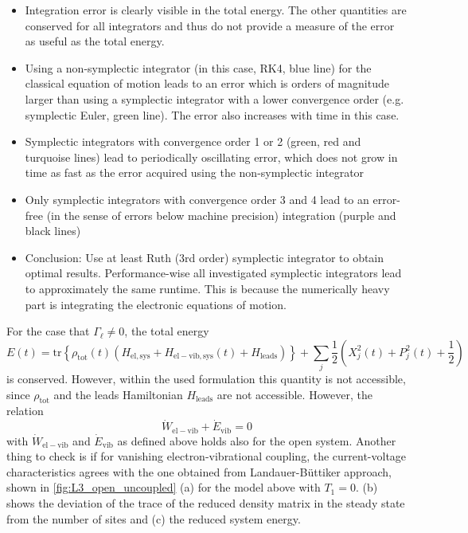 \documentclass{article}
\newcommand{\tr}[1]{\mathrm{tr}\left\{#1\right\}}
\begin{document}
\begin{itemize}
	\item Integration error is clearly visible in the total energy. The other quantities are conserved for all integrators and thus do not provide a measure of the error as useful as the total energy.
	\item Using a non-symplectic integrator (in this case, RK4, blue line) for the classical equation of motion leads to an error which is orders of magnitude larger than using a symplectic integrator with a lower convergence order (e.g. symplectic Euler, green line). The error also increases with time in this case.
	\item Symplectic integrators with convergence order 1 or 2 (green, red and turquoise lines) lead to periodically oscillating error, which does not grow in time as fast as the error acquired using the non-symplectic integrator
	\item Only symplectic integrators with convergence order 3 and 4 lead to an error-free (in the sense of errors below machine precision) integration (purple and black lines)
	\item Conclusion: Use at least Ruth (3rd order) symplectic integrator to obtain optimal results. Performance-wise all investigated symplectic integrators lead to approximately the same runtime. This is because the numerically heavy part is integrating the electronic equations of motion.
\end{itemize}	
For the case that $\Gamma_\ell\neq 0$, the total energy
\begin{equation*}
	E(t) = \tr{\rho_\mathrm{tot}(t)(H_\mathrm{el,sys}+H_\mathrm{el-vib,sys}(t)+H_\mathrm{leads})} + \sum_j \frac{1}{2}\left(X_j^2(t) + P_j^2(t) + \frac{1}{2}\right)
\end{equation*}
is conserved. However, within the used formulation this quantity is not accessible, since $\rho_\mathrm{tot}$ and the leads Hamiltonian $H_\mathrm{leads}$ are not accessible. However, the relation
\begin{equation*}
	\dot{W}_\mathrm{el-vib} + \dot{E}_\mathrm{vib} = 0
\end{equation*}
with $\dot{W}_\mathrm{el-vib}$ and $\dot{E}_\mathrm{vib}$ as defined above holds also for the open system. 
Another thing to check is if for vanishing electron-vibrational coupling, the current-voltage characteristics agrees with the one obtained from Landauer-Büttiker approach, shown in \cref{fig:L3_open_uncoupled} (a) for the model above with $T_1=0$.  (b) shows the deviation of the trace of the reduced density matrix in the steady state from the number of sites and (c) the reduced system energy.
\end{document}
